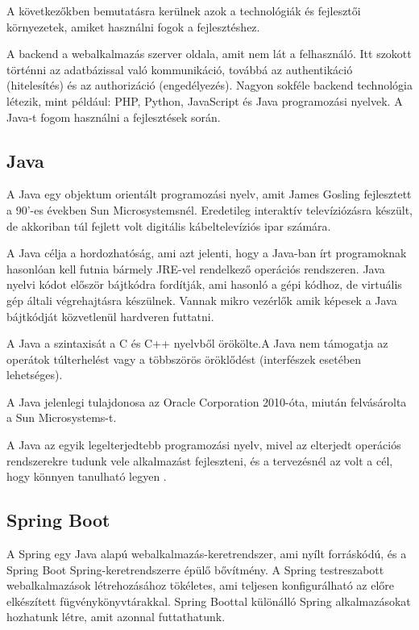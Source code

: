 
A következőkben bemutatásra kerülnek azok a technológiák és fejlesztői környezetek, amiket használni fogok a fejlesztéshez.


A backend a webalkalmazás szerver oldala, amit nem lát a felhasználó. Itt szokott történni az adatbázissal való kommunikáció, továbbá az authentikáció (hitelesítés) és az authorizáció (engedélyezés). Nagyon sokféle backend technológia létezik, mint például: PHP, Python, JavaScript és Java programozási nyelvek. A Java-t fogom használni a fejlesztések során.

\subsection{Java}

A Java \cite{Java} egy objektum orientált programozási nyelv, amit James Gosling fejlesztett a 90’-es években Sun Microsystemsnél. Eredetileg interaktív televíziózásra készült, de akkoriban túl fejlett volt digitális kábeltelevíziós ipar számára.

A Java célja a hordozhatóság, ami azt jelenti, hogy a Java-ban írt programoknak hasonlóan kell futnia bármely JRE-vel rendelkező operációs rendszeren. Java nyelvi kódot először bájtkódra fordítják, ami hasonló a gépi kódhoz, de virtuális gép általi végrehajtásra készülnek. Vannak mikro vezérlők amik képesek a Java bájtkódját közvetlenül hardveren futtatni.

A Java a szintaxisát a C és C++ nyelvből örökölte.A Java nem támogatja az operátok túlterhelést vagy a többszörös öröklődést (interfészek esetében lehetséges).

A Java jelenlegi tulajdonosa az Oracle Corporation 2010-óta, miután felvásárolta a Sun Microsystems-t.

A Java az egyik legelterjedtebb programozási nyelv, mivel az elterjedt operációs rendszerekre tudunk vele alkalmazást fejleszteni, és a tervezésnél az volt a cél, hogy könnyen tanulható legyen .

\subsection{Spring Boot}

A Spring egy Java alapú webalkalmazás-keretrendszer, ami nyílt forráskódú, és a Spring Boot Spring-keretrendszerre épülő bővítmény. A Spring testreszabott webalkalmazások létrehozásához tökéletes, ami teljesen konfigurálható az előre elkészített fügvénykönyvtárakkal. Spring Boottal különálló Spring alkalmazásokat hozhatunk létre, amit azonnal futtathatunk.

